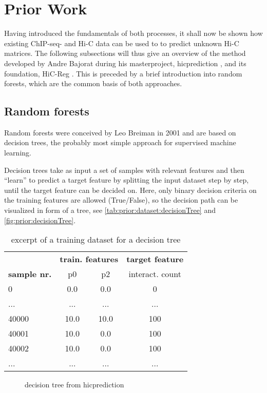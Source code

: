\section{Prior Work}
Having introduced the fundamentals of both processes,
it shall now be shown how existing ChIP-seq- and Hi-C data 
can be used to to predict unknown Hi-C matrices.
The following subsections will thus give an overview of the
method developed by Andre Bajorat during his masterproject, hicprediction \cite{Bajorat2019},
and its foundation, HiC-Reg \cite{Zhang2019, Zhang2018}.
This is preceded by a brief introduction into random forests,
which are the common basis of both approaches.

\subsection{Random forests} \label{sec:prior:randomForests}
Random forests were conceived by Leo Breiman in 2001 \cite{Breiman2001} and are based on decision trees,
the probably most simple approach for supervised machine learning.

Decision trees take as input a set of samples with relevant features and then
``learn'' to predict a target feature by splitting the input dataset step by step, 
until the target feature can be decided on.
Here, only binary decision criteria on the training features are allowed (True/False), so the decision path can be
visualized in form of a tree, see \autoref{tab:prior:dataset:decisionTree} and \autoref{fig:prior:decisionTree}.
\begin{table}[hb]
\centering
\begin{tabular}{lccc} \hline
	   & \multicolumn{2}{c}{\textbf{train. features}} & \textbf{target feature}\\
 \textbf{sample nr.} & p0  	& p2 	& interact. count\\
 \hline
 0	& 0.0	& 0.0	& 0\\
 ...	& ...	& ...	& ...\\
 40000 	& 10.0  & 10.0	& 100\\
 40001 	& 10.0  & 0.0 	& 100\\
 40002  & 10.0  & 0.0 	& 100\\
 ...	& ...	& ...	& ...\\
 \hline
\end{tabular}
\caption{excerpt of a training dataset for a decision tree} \label{tab:prior:dataset:decisionTree}
\end{table}
\begin{figure}[hb]
 \centering
 \caption{decision tree from hicprediction}
 \label{fig:prior:decisionTree}
\end{figure}

